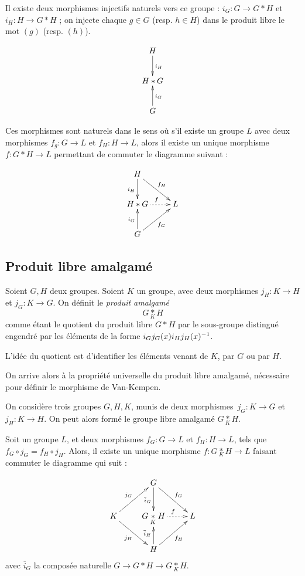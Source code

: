 \documentclass[hidelinks, 10pt]{article}
\begin{document}
\begin{remark}
Il existe deux morphismes injectifs naturels vers ce groupe : $i_G:G\rightarrow G\ast H$ et $i_H:H\rightarrow G\ast H$ ; on injecte chaque $g\in G$ (resp. $h\in H$) dans le produit libre le mot $(g)$ (resp. $(h)$).

\[\xymatrix{
  H \ar[d]^{i_H}\\
  H\ast G\\
  G \ar[u]_{i_G}}
\]

Ces morphismes sont naturels dans le sens où s'il existe un groupe $L$ avec deux morphismes $f_g:G\rightarrow L$ et $f_H:H\rightarrow L$, alors il existe un unique morphisme $f:G\ast H\rightarrow L$ permettant de commuter le diagramme suivant : 

\[\xymatrix{
H \ar[d]_{i_H}\ar[rd]^{f_H}\\
H\ast G\ar@{.>}[r]^f& L\\
G \ar[u]^{i_G}\ar[ru]_{f_G}
}\]
\end{remark}

\subsection{Produit libre amalgamé}
\begin{definition}
Soient $G,H$ deux groupes. Soient $K$ un groupe, avec deux morphismes $j_H:K\rightarrow H$ et $j_G:K\rightarrow G$. On définit le \emph{produit amalgamé} $$G\underset{K}{\ast}H$$ comme étant le quotient du produit libre $G\ast H$ par le sous-groupe distingué engendré par les éléments de la forme $i_Gj_G(x)i_Hj_H(x)^{-1}$.
\end{definition}
\begin{remark}
L'idée du quotient est d'identifier les éléments venant de $K$, par $G$ ou par $H$.
\end{remark}
On arrive alors à la propriété universelle du produit libre amalgamé, nécessaire pour définir le morphisme de Van-Kempen.

\begin{proposition}\label{prop:univ-prod-amal}
On considère trois groupes $G,H,K$, munis de deux morphismes~$j_G:K\to G$ et $j_H:K\to H$. On peut alors formé le groupe libre amalgamé $G\underset{K}{\ast}H$.

Soit un groupe $L$, et deux morphismes $f_G:G\to L$ et $f_H:H\to L$, tels que~$f_G\circ j_G=f_H\circ j_H$. Alors, il existe un unique morphisme $f:G\underset{K}{\ast}H\to L$ faisant commuter le diagramme qui suit :

\[\xymatrix{
&G \ar[d]_{\overline{i}_G}\ar[rd]^{f_G}\\
K\ar[ru]^{j_G}\ar[rd]_{j_H} &G\underset{K}{\ast}H\ar@{.>}[r]^f& L\\
&H \ar[u]^{\overline{i}_H}\ar[ru]_{f_H}
}\]avec $\overline{i}_G$ la composée naturelle $G\to G\ast H\to G\underset{K}{\ast}H$.
\end{proposition}
\end{document}
